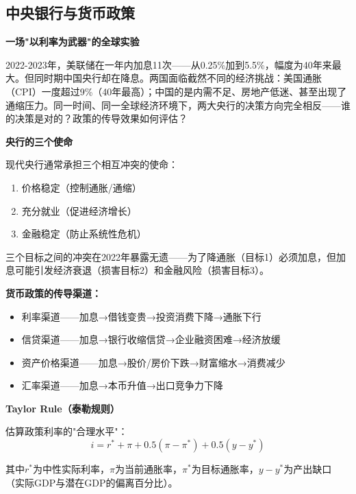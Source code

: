 \documentclass[a4paper,11pt]{ctexbook}
\begin{document}
{\begin{lessonsummary}
\newpage
\chapter{中央银行与货币政策}

\begin{scenario}
\textbf{一场"以利率为武器"的全球实验}

2022-2023年，美联储在一年内加息11次——从0.25\%加到5.5\%，幅度为40年来最大。但同时期中国央行却在降息。两国面临截然不同的经济挑战：美国通胀（CPI）一度超过9\%（40年最高）；中国的是内需不足、房地产低迷、甚至出现了通缩压力。同一时间、同一全球经济环境下，两大央行的决策方向完全相反——谁的决策是对的？政策的传导效果如何评估？
\end{scenario}

\begin{qualitative}
\textbf{央行的三个使命}

现代央行通常承担三个相互冲突的使命：
\begin{enumerate}
  \item 价格稳定（控制通胀/通缩）
  \item 充分就业（促进经济增长）
  \item 金融稳定（防止系统性危机）
\end{enumerate}

三个目标之间的冲突在2022年暴露无遗——为了降通胀（目标1）必须加息，但加息可能引发经济衰退（损害目标2）和金融风险（损害目标3）。

\textbf{货币政策的传导渠道：}
\begin{itemize}
  \item 利率渠道——加息→借钱变贵→投资消费下降→通胀下行
  \item 信贷渠道——加息→银行收缩信贷→企业融资困难→经济放缓
  \item 资产价格渠道——加息→股价/房价下跌→财富缩水→消费减少
  \item 汇率渠道——加息→本币升值→出口竞争力下降
\end{itemize}
\end{qualitative}

\begin{quantitative}
\textbf{Taylor Rule（泰勒规则）}

估算政策利率的"合理水平"：
\[
i = r^* + \pi + 0.5(\pi - \pi^*) + 0.5(y - y^*)
\]

其中$r^*$为中性实际利率，$\pi$为当前通胀率，$\pi^*$为目标通胀率，$y-y^*$为产出缺口（实际GDP与潜在GDP的偏离百分比）。


\end{quantitative}
\end{lessonsummary}}
\end{document}
